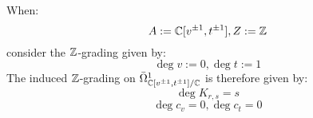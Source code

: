 \begin{remark}
            When:
                $$A := \mathbb{C}[v^{\pm 1}, t^{\pm 1}], Z := \mathbb{Z}$$
            consider the $\mathbb{Z}$-grading given by:
                $$\deg v := 0, \deg t := 1$$
            The induced $\mathbb{Z}$-grading on $\bar{\Omega}^1_{\mathbb{C}[v^{\pm 1}, t^{\pm 1}]/\mathbb{C}}$ is therefore given by:
                $$\deg K_{r, s} = s$$
                $$\deg c_v = 0, \deg c_t = 0$$
        \end{remark}